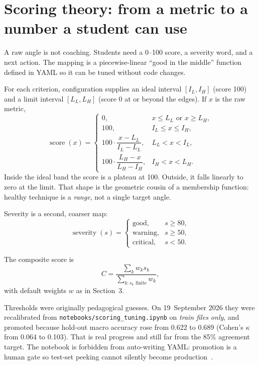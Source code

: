 \documentclass[11pt,a4paper]{article}
\newcommand{\code}[1]{\texttt{#1}}
\begin{document}
\section{Scoring theory: from a metric to a number a student can use}
\label{sec:scoring}

A raw angle is not coaching.
Students need a 0--100 score, a severity word, and a next action.
The mapping is a piecewise-linear \enquote{good in the middle} function defined in YAML so it can be tuned without code changes.

For each criterion, configuration supplies an ideal interval \([I_L, I_H]\) (score 100) and a limit interval \([L_L, L_H]\) (score 0 at or beyond the edges).
If \(x\) is the raw metric,
\begin{equation}
  \operatorname{score}(x) =
  \begin{cases}
    0, & x \le L_L \text{ or } x \ge L_H, \\[0.3em]
    100, & I_L \le x \le I_H, \\[0.3em]
    100 \cdot \dfrac{x - L_L}{I_L - L_L}, & L_L < x < I_L, \\[0.3em]
    100 \cdot \dfrac{L_H - x}{L_H - I_H}, & I_H < x < L_H.
  \end{cases}
\end{equation}
Inside the ideal band the score is a plateau at 100.
Outside, it falls linearly to zero at the limit.
That shape is the geometric cousin of a membership function: healthy technique is a \emph{range}, not a single target angle.

Severity is a second, coarser map:
\begin{equation}
  \operatorname{severity}(s) =
  \begin{cases}
    \text{good}, & s \ge 80, \\
    \text{warning}, & s \ge 50, \\
    \text{critical}, & s < 50.
  \end{cases}
\end{equation}

The composite score is
\begin{equation}
  C = \frac{\sum_k w_k s_k}{\sum_{k:s_k \text{ finite}} w_k},
\end{equation}
with default weights \(w\) as in Section~3.

Thresholds were originally pedagogical guesses.
On 19~September 2026 they were recalibrated from \code{notebooks/scoring\_tuning.ipynb} on \emph{train files only}, and promoted because hold-out macro accuracy rose from 0.622 to 0.689 (Cohen's \(\kappa\) from 0.064 to 0.103).
That is real progress and still far from the 85\% agreement target.
The notebook is forbidden from auto-writing YAML: promotion is a human gate so test-set peeking cannot silently become production~\cite{mlupgrade}.
\end{document}
